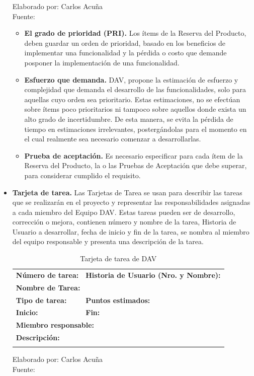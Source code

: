\documentclass[a4paper, openright, 12pt]{report}
\begin{document}
\begin{itemize}
\begin{center}
Elaborado por: Carlos Acuña\\Fuente: \cite{Implementacion2011}
\end{center}

\begin{itemize}
\item \textbf{El grado de prioridad (PRI).} Los ítems de la Reserva del Producto, deben guardar un orden de prioridad, basado en los beneficios de implementar una funcionalidad y la pérdida o costo que demande posponer la implementación de una funcionalidad.\cite{Implementacion2011}
\item \textbf{Esfuerzo que demanda.} DAV, propone la estimación de esfuerzo y complejidad que demanda el desarrollo de las funcionalidades, solo para aquellas cuyo orden sea prioritario. Estas estimaciones, no se efectúan sobre ítems poco prioritarios ni tampoco sobre aquellos donde exista un alto grado de incertidumbre. De esta manera, se evita la pérdida de tiempo en estimaciones irrelevantes, postergándolas para el momento en el cual realmente sea necesario comenzar a desarrollarlas.\cite{Implementacion2011}
\item \textbf{Prueba de aceptación.} Es necesario especificar para cada ítem de la Reserva del Producto, la o las Pruebas de Aceptación que debe superar, para considerar cumplido el requisito.\cite{Implementacion2011}
\end{itemize}
\item \textbf{Tarjeta de tarea.} Las Tarjetas de Tarea se usan para describir las tareas que se realizarán en el proyecto y representar las responsabilidades asignadas a cada miembro del Equipo DAV. Estas tareas pueden ser de desarrollo, corrección o mejora, contienen número y nombre de la tarea, Historia de Usuario a desarrollar, fecha de inicio y fin de la tarea, se nombra al miembro del equipo responsable y presenta una descripción de la tarea. \cite{Implementacion2011}

\begin{longtable}{| p{6cm} | p{6cm} |}
\captionsetup{justification=centering,margin=2cm}
\hline
\multicolumn{2}{|c|}{\textbf{Tarjeta de tarea}} \\
\hline
\textbf{Número de tarea:}  & \textbf{Historia de Usuario (Nro. y Nombre):} \\
\hline
\multicolumn{2}{|p{12cm}|}{\textbf{Nombre de Tarea:}} \\ \hline
\textbf{Tipo de tarea:} & \textbf{Puntos estimados:}  \\ \hline
\textbf{Inicio:} & \textbf{Fin:} \\ \hline
\multicolumn{2}{|p{12cm}|}{\textbf{Miembro responsable:}} \\ \hline
\multicolumn{2}{|p{12cm}|}{\textbf{Descripción:}} \\ \hline
\caption{Tarjeta de tarea de DAV}
\end{longtable}
\begin{center}
Elaborado por: Carlos Acuña\\Fuente: \cite{Implementacion2011}
\end{center}
\end{itemize}
\end{document}
